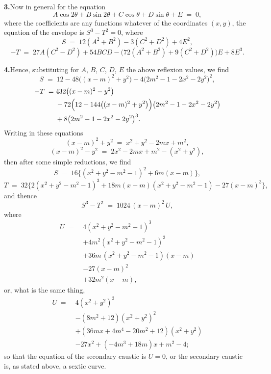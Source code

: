 \documentclass[11pt]{article}
\begin{document}
\textbf{3.}\quad Now in general for the equation
\[
A\cos 2\theta + B\sin 2\theta + C\cos\theta + D\sin\theta + E \;=\; 0,
\]
where the coefficients are any functions whatever of the coordinates $(x, y)$, the equation of the envelope is $S^{3} - T^{2} = 0$, where
\[
S \;=\; 12(A^{2} + B^{2}) - 3(C^{2} + D^{2}) + 4 E^{2},
\]
\[
-T \;=\; 27 A(C^{2} - D^{2}) + 54 BCD - \bigl(72(A^{2} + B^{2}) + 9(C^{2} + D^{2})\bigr) E + 8 E^{3}.
\]

\textbf{4.}\quad Hence, substituting for $A$, $B$, $C$, $D$, $E$ the above reflexion values, we find
\[
S \;=\; 12 - 48\bigl((x - m)^{2} + y^{2}\bigr) + 4\bigl(2 m^{2} - 1 - 2 x^{2} - 2 y^{2}\bigr)^{2},
\]
\begin{align*}
-T \;=\;& 432\bigl((x - m)^{2} - y^{2}\bigr)\\
& - 72\Bigl(12 + 144\bigl((x - m)^{2} + y^{2}\bigr)\Bigr)\bigl(2 m^{2} - 1 - 2 x^{2} - 2 y^{2}\bigr)\\
& + 8\bigl(2 m^{2} - 1 - 2 x^{2} - 2 y^{2}\bigr)^{3}.
\end{align*}
Writing in these equations
\[
(x - m)^{2} + y^{2} \;=\; x^{2} + y^{2} - 2 m x + m^{2},
\]
\[
(x - m)^{2} - y^{2} \;=\; 2 x^{2} - 2 m x + m^{2} - (x^{2} + y^{2}),
\]
then after some simple reductions, we find
\[
S \;=\; 16\bigl\{(x^{2} + y^{2} - m^{2} - 1)^{2} + 6 m(x - m)\bigr\},
\]
\[
T \;=\; 32\bigl\{2(x^{2} + y^{2} - m^{2} - 1)^{3} + 18 m(x - m)(x^{2} + y^{2} - m^{2} - 1) - 27(x - m)^{3}\bigr\},
\]
and thence
\[
S^{3} - T^{2} \;=\; 1024\,(x - m)^{2}\,U,
\]
where
\begin{align*}
U \;=\;& 4(x^{2} + y^{2} - m^{2} - 1)^{3}\\
& + 4 m^{2}(x^{2} + y^{2} - m^{2} - 1)^{2}\\
& + 36 m\,(x^{2} + y^{2} - m^{2} - 1)(x - m)\\
& - 27(x - m)^{2}\\
& + 32 m^{2}(x - m),
\end{align*}
or, what is the same thing,
\begin{align*}
U \;=\;& 4(x^{2} + y^{2})^{3}\\
& - (8 m^{2} + 12)(x^{2} + y^{2})^{2}\\
& + (36 m x + 4 m^{4} - 20 m^{2} + 12)(x^{2} + y^{2})\\
& - 27 x^{2} + (-4 m^{3} + 18 m)x + m^{2} - 4;
\end{align*}
so that the equation of the secondary caustic is $U = 0$, or the secondary caustic is, as stated above, a sextic curve.
\end{document}
